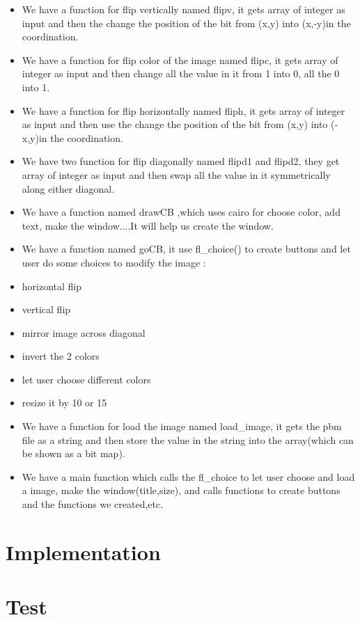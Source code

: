 \documentclass{article}
\begin{document}
\begin{itemize}
	\item We have a function for flip vertically named flipv, 
	it gets array of integer as input and then the change the 
	position of the bit from (x,y) into (x,-y)in the coordination.
	\item We have a function for flip color of the image named 
	flipc, it gets array of integer as input and then change all 
	the value in it from 1 into 0, all the 0 into 1.
	\item We have a function for flip horizontally named fliph, 
	it gets array of integer as input and then use the change 
	the position of the bit from (x,y) into (-x,y)in the coordination.
	\item We have two function for flip diagonally named flipd1 and 
	flipd2, they get array of integer as input and then swap all the 
	value in it symmetrically along either diagonal.
	\item We have a function named drawCB ,which uses cairo for choose color, 
	add text, make the window....It will help us create the window.
	\newpage
	\item We have a function named goCB, it use fl\_choice() to create 
	buttons and let user do some choices to modify the image :
		\item horizontal flip
		\item vertical flip
		\item mirror image across diagonal
		\item invert the 2 colors
		\item let user choose different colors
		\item resize it by 10 or 15
	\item We have a function for load the image named load\_image, 
	it gets the pbm file as a string and then store the value in 
	the string into the array(which can be shown as a bit map).
	\item We have a main function which calls the fl\_choice to let  
	user choose and load a image, make the window(title,size), and calls 
	functions to create buttons and the functions we created,etc.
\end{itemize}
\newpage\section*{Implementation}

\newpage\section*{Test}
\end{document}
